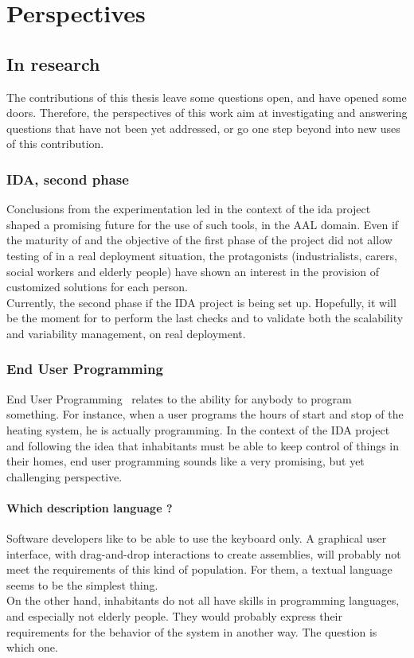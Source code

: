 \chapter{Perspectives}
\section{In research}

The contributions of this thesis leave some questions open, and have opened some doors. Therefore, the perspectives of this work aim at investigating and answering questions that have not been yet addressed, or go one step beyond into new uses of this contribution.


\subsection{IDA, second phase}
Conclusions from the experimentation led in the context of the \gls{ida} project shaped a promising future for the use of such tools, in the AAL domain. Even if the maturity of \enti{} and the objective of the first phase of the project did not allow testing of \enti{} in a real deployment situation, the protagonists (industrialists, carers, social workers and elderly people) have shown an interest in the provision of customized solutions for each person.\\
Currently, the second phase if the IDA project is being set up. Hopefully, it will be the moment for \enti{} to perform the last checks and to validate both the scalability and variability management, on real deployment.


\subsection{End User Programming}

End User Programming~\cite{Ko:2011} relates to the ability for anybody to program something. For instance, when a user programs the hours of start and stop of the heating system, he is actually programming. In the context of the IDA project and following the idea that inhabitants must be able to keep control of things in their homes, end user programming sounds like a very promising, but yet challenging perspective.\\

\subsubsection{Which description language ?}
Software developers like to be able to use the keyboard only. A graphical user interface, with drag-and-drop interactions to create assemblies, will probably not meet the requirements of this kind of population. For them, a textual language seems to be the simplest thing.\\
On the other hand, inhabitants do not all have skills in programming languages, and especially not elderly people. They would probably express their requirements for the behavior of the system in another way. The question is which one.\\

